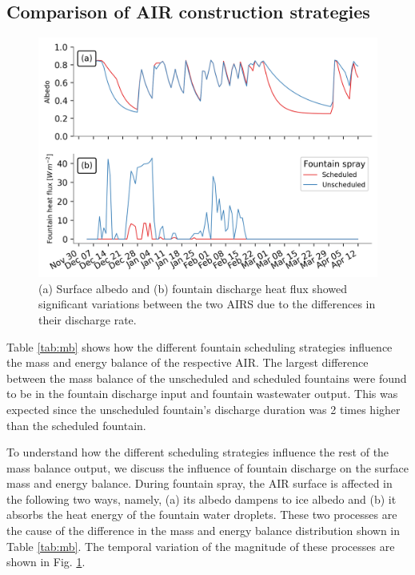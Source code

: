 \documentclass[tc, manuscript]{copernicus}
\begin{document}
\subsection{Comparison of AIR construction strategies}

\begin{figure}[t]
\includegraphics[width=12cm]{Figures/dis_processes.png}
\caption{(a) Surface albedo  and (b) fountain discharge heat flux showed significant variations between the two
  AIRS due to the differences in their discharge rate.}
\label{fig:dis_processes}
\end{figure}

Table \ref{tab:mb} shows how the different fountain scheduling strategies influence the mass and energy balance
of the respective AIR. The largest difference between the mass balance of the unscheduled and scheduled
fountains were found to be in the fountain discharge input and fountain wastewater output. This was expected
since the unscheduled fountain's discharge duration was 2 times higher than the scheduled fountain.

To understand how the different scheduling strategies influence the rest of the mass balance output, we discuss
the influence of fountain discharge on the surface mass and energy balance. During fountain spray, the AIR
surface is affected in the following two ways, namely, (a) its albedo dampens to ice albedo and (b) it absorbs
the heat energy of the fountain water droplets. These two processes are the cause of the difference in the mass
and energy balance distribution shown in Table \ref{tab:mb}. The temporal variation of the magnitude of these
processes are shown in Fig. \ref{fig:dis_processes}. 
\end{document}
